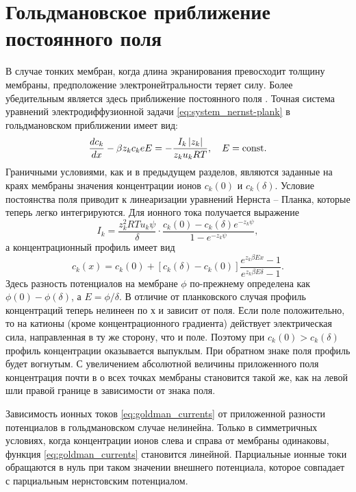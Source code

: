 \section{Гольдмановское приближение постоянного поля}
В случае тонких мембран, когда длина экранирования превосходит толщину мембраны,
предположение электронейтральности теряет силу. Более убедительным является
здесь приближение постоянного поля \cite{bib:17}. Точная система уравнений
электродиффузионной задачи \eqref{eq:system_nernst-plank} в гольдмановском
приближении имеет вид:
\[
    \frac{d c_k}{d x} - \beta z_k c_k e E = - \frac{I_k\left| z_k \right|}{z_k u_k RT},
    \quad E = \mathrm{const}.
\]
Граничными условиями, как и в предыдущем разделов, являются заданные на краях
мембраны значения концентрации ионов \( c_k(0) \) и \( c_k(\delta) \). Условие
постоянства поля приводит к линеаризации уравнений Нернста -- Планка, которые
теперь легко интегрируются. Для ионного тока получается выражение
\begin{equation}
    I_k = \frac{z_k^2 RT u_k \psi}{\delta}\cdot
        \frac{c_k(0) - c_k(\delta)e^{-z_k\psi}}{1 - e^{-z_k\psi}},
        \label{eq:goldman_currents}
\end{equation}
а концентрационный профиль имеет вид
\[
    c_k(x) = c_k(0) +
    [c_k(\delta) - c_k(0)]\frac{e^{z_k\beta Ex} - 1}{e^{z_k\beta E\delta} - 1}.
\]
Здесь разность потенциалов на мембране \( \phi \) по-прежнему определена как
\( \phi(0) - \phi(\delta) \), а \( E = \phi/\delta \). В отличие от планковского
случая профиль концентраций теперь нелинеен по х и зависит от поля. Если поле
положительно, то на катионы (кроме концентрационного градиента) действует
электрическая сила, направленная в ту же сторону, что и поле. Поэтому при
\( c_k(0) > c_k(\delta) \) профиль концентрации оказывается выпуклым. При
обратном знаке поля профиль будет вогнутым. С увеличением абсолютной величины
приложенного поля концентрация почти в о всех точках мембраны становится такой
же, как на левой шли правой границе в зависимости от знака поля.

Зависимость ионных токов \eqref{eq:goldman_currents} от приложенной разности
потенциалов в гольдмановском случае нелинейна. Только в симметричных условиях,
когда концентрации ионов слева и справа от мембраны одинаковы, функция
\eqref{eq:goldman_currents} становится линейной. Парциальные ионные токи
обращаются в нуль при таком значении внешнего потенциала, которое совпадает с
парциальным нернстовским потенциалом.


